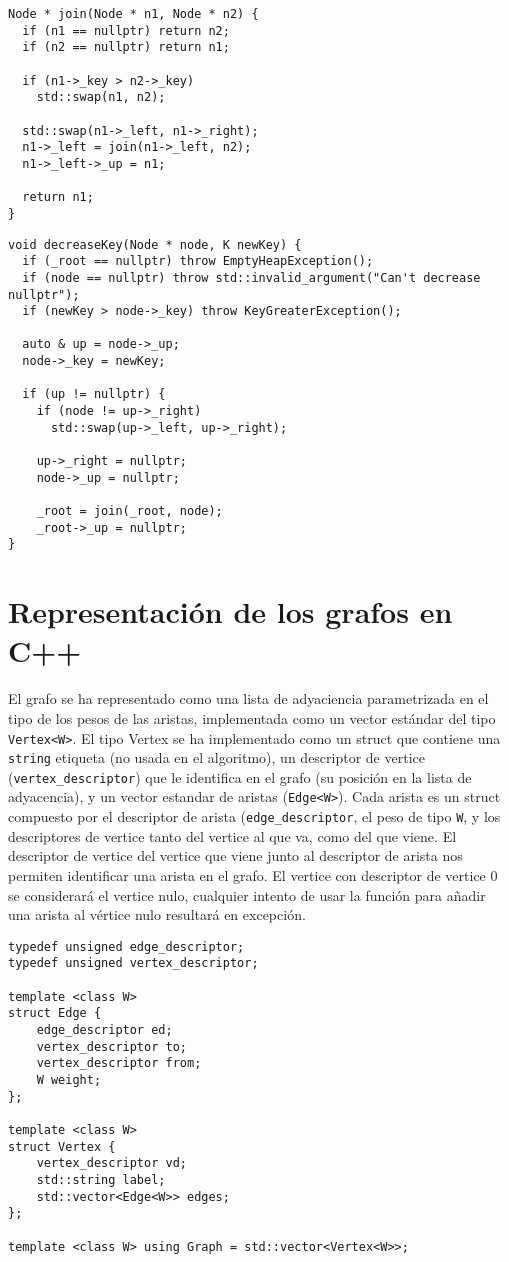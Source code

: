 \documentclass{article}
\begin{document}
\begin{verbatim}
Node * join(Node * n1, Node * n2) {
  if (n1 == nullptr) return n2;
  if (n2 == nullptr) return n1;

  if (n1->_key > n2->_key)
	std::swap(n1, n2);

  std::swap(n1->_left, n1->_right);
  n1->_left = join(n1->_left, n2);
  n1->_left->_up = n1;

  return n1;
}
\end{verbatim}
\begin{verbatim}
void decreaseKey(Node * node, K newKey) {
  if (_root == nullptr) throw EmptyHeapException();
  if (node == nullptr) throw std::invalid_argument("Can't decrease nullptr");
  if (newKey > node->_key) throw KeyGreaterException();

  auto & up = node->_up;
  node->_key = newKey;

  if (up != nullptr) {
	if (node != up->_right)
	  std::swap(up->_left, up->_right);

	up->_right = nullptr;
	node->_up = nullptr;

	_root = join(_root, node);
	_root->_up = nullptr;
}
\end{verbatim}

\section{Representación de los grafos en C++}
El grafo se ha representado como una lista de adyaciencia parametrizada
en el tipo de los pesos de las aristas, implementada como un vector estándar del 
tipo \texttt{Vertex<W>}. El tipo Vertex se ha implementado como un struct que
contiene una \texttt{string} etiqueta (no usada en el algoritmo), un descriptor de
vertice (\texttt{vertex\_descriptor}) que le identifica en el grafo (su posición en
la lista de adyacencia), y un vector estandar de aristas (\texttt{Edge<W>}). Cada arista es un struct compuesto por el descriptor de arista (\texttt{edge\_descriptor}, el peso de tipo \texttt{W}, y los descriptores de vertice tanto del vertice al que va, como del que viene. El descriptor de vertice del vertice que viene junto al descriptor de arista nos permiten identificar una arista en el grafo. El vertice con descriptor de vertice 0 se considerará el vertice nulo, cualquier intento de usar la función para añadir una arista al vértice nulo resultará en excepción.
\begin{verbatim}
typedef unsigned edge_descriptor;
typedef unsigned vertex_descriptor;

template <class W> 
struct Edge {
    edge_descriptor ed;
    vertex_descriptor to;
    vertex_descriptor from;
    W weight;
};

template <class W>
struct Vertex {
    vertex_descriptor vd;
    std::string label;
    std::vector<Edge<W>> edges;
};

template <class W> using Graph = std::vector<Vertex<W>>;
\end{verbatim}
\end{document}
